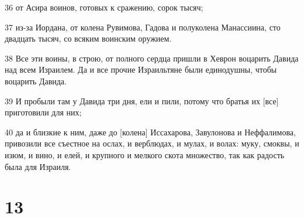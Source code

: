 \par 36 от Асира воинов, готовых к сражению, сорок тысяч;
\par 37 из-за Иордана, от колена Рувимова, Гадова и полуколена Манассиина, сто двадцать тысяч, со всяким воинским оружием.
\par 38 Все эти воины, в строю, от полного сердца пришли в Хеврон воцарить Давида над всем Израилем. Да и все прочие Израильтяне были единодушны, чтобы воцарить Давида.
\par 39 И пробыли там у Давида три дня, ели и пили, потому что братья их [все] приготовили для них;
\par 40 да и близкие к ним, даже до [колена] Иссахарова, Завулонова и Неффалимова, привозили все съестное на ослах, и верблюдах, и мулах, и волах: муку, смоквы, и изюм, и вино, и елей, и крупного и мелкого скота множество, так как радость была для Израиля.

\chapter{13}

